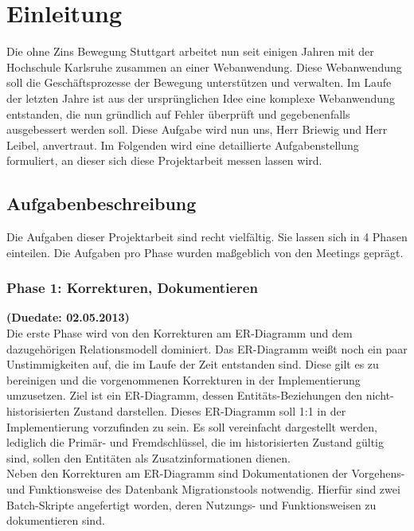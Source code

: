 \documentclass[12pt,             %
               a4paper,          %
               listof=totoc,     %
               index=totoc,      %
               bibliography=totoc,%
               oneside,         %
               BCOR1cm,          %
               english   %
               ]{scrbook}
\begin{document}
\chapter{Einleitung}
Die ohne Zins Bewegung Stuttgart arbeitet nun seit einigen Jahren mit der Hochschule Karlsruhe zusammen an einer Webanwendung. Diese Webanwendung soll die Geschäftsprozesse der Bewegung unterstützen und verwalten. Im Laufe der letzten Jahre ist aus der ursprünglichen Idee eine komplexe Webanwendung entstanden, die nun gründlich auf Fehler überprüft und gegebenenfalls ausgebessert werden soll. 
Diese Aufgabe wird nun uns, Herr Briewig und Herr Leibel, anvertraut. Im Folgenden wird eine detaillierte Aufgabenstellung formuliert, an dieser sich diese Projektarbeit messen lassen wird.  

\section{Aufgabenbeschreibung}
Die Aufgaben dieser Projektarbeit sind recht vielfältig. Sie lassen sich in 4 Phasen einteilen. Die Aufgaben pro Phase wurden maßgeblich von den Meetings geprägt.

\subsection{Phase 1: Korrekturen, Dokumentieren}
\textbf {(Duedate: 02.05.2013)}\\
Die erste Phase wird von den Korrekturen am ER-Diagramm und dem dazugehörigen Relationsmodell dominiert. Das ER-Diagramm weißt noch ein paar Unstimmigkeiten auf, die im Laufe der Zeit entstanden sind. Diese gilt es zu bereinigen und die vorgenommenen Korrekturen in der Implementierung umzusetzen. Ziel ist ein ER-Diagramm, dessen Entitäts-Beziehungen den nicht-historisierten Zustand darstellen. Dieses ER-Diagramm soll 1:1 in der Implementierung vorzufinden zu sein. Es soll vereinfacht dargestellt werden, lediglich die Primär- und Fremdschlüssel, die im historisierten Zustand gültig sind, sollen den Entitäten als Zusatzinformationen dienen.\\

Neben den Korrekturen am ER-Diagramm sind Dokumentationen der Vorgehens- und Funktionsweise des Datenbank Migrationstools notwendig. Hierfür sind zwei Batch-Skripte angefertigt worden, deren Nutzungs- und Funktionsweisen zu dokumentieren sind.\\
\end{document}
